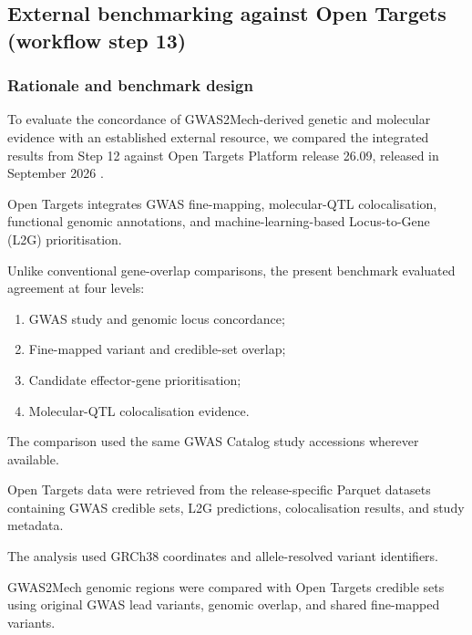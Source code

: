 \documentclass[11pt,a4paper]{article}
\begin{document}

\subsection{External benchmarking against Open Targets (workflow step 13)}
\label{sec:opentargets_benchmark}

\subsubsection{Rationale and benchmark design}

To evaluate the concordance of GWAS2Mech-derived
genetic and molecular evidence with an established
external resource, we compared the integrated
results from Step 12 against Open Targets Platform
release 26.09, released in September 2026
\citep{Cerezo2025,Mountjoy2021,
OpenTargets2026Release}.

Open Targets integrates GWAS fine-mapping,
molecular-QTL colocalisation, functional genomic
annotations, and machine-learning-based
Locus-to-Gene (L2G) prioritisation.

Unlike conventional gene-overlap comparisons,
the present benchmark evaluated agreement at
four levels:

\begin{enumerate}
    \item GWAS study and genomic locus concordance;
    \item Fine-mapped variant and credible-set overlap;
    \item Candidate effector-gene prioritisation;
    \item Molecular-QTL colocalisation evidence.
\end{enumerate}

The comparison used the same GWAS Catalog study
accessions wherever available.

Open Targets data were retrieved from the
release-specific Parquet datasets containing
GWAS credible sets, L2G predictions,
colocalisation results, and study metadata.

The analysis used GRCh38 coordinates and
allele-resolved variant identifiers.

GWAS2Mech genomic regions were compared with
Open Targets credible sets using original
GWAS lead variants, genomic overlap, and
shared fine-mapped variants.
\end{document}

